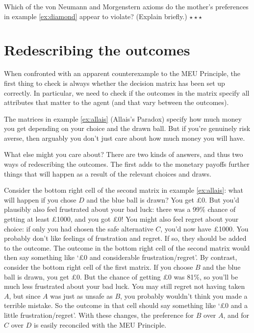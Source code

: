 \begin{exercise}
  Which of the von Neumann and Morgenstern axioms do the mother's
  preferences in example \ref{ex:diamond} appear to violate? (Explain
  briefly.)  $\star \star \star$
\end{exercise}


\section{Redescribing the outcomes}

When confronted with an apparent counterexample to the MEU Principle,
the first thing to check is always whether the decision matrix has
been set up correctly. In particular, we need to check if the outcomes
in the matrix specify all attributes that matter to the agent (and
that vary between the outcomes).

The matrices in example \ref{ex:allais} (Allais's Paradox) specify how
much money you get depending on your choice and the drawn ball. But if
you're genuinely risk averse, then arguably you don't just care about
how much money you will have. 

What else might you care about? There are two kinds of answers, and
thus two ways of redescribing the outcomes. The first adds to the
monetary payoffs further things that will happen as a result of the
relevant choices and draws.

Consider the bottom right cell of the second matrix in example
\ref{ex:allais}: what will happen if you chose $D$ and the blue ball
is drawn? You get £0. But you'd plausibly also feel frustrated about
your bad luck: there was a 99\% chance of getting at least £1000, and
you got £0! You might also feel regret about your choice: if only you
had chosen the safe alternative $C$, you'd now have £1000. You
probably don't like feelings of frustration and regret. If so, they
should be added to the outcome. The outcome in the bottom right cell
of the second matrix would then say something like `£0 and
considerable frustration/regret'. By contrast, consider the bottom
right cell of the first matrix. If you choose $B$ and the blue ball is
drawn, you get £0. But the chance of getting £0 was 81\%, so you'll be
much less frustrated about your bad luck. You may still regret not
having taken $A$, but since $A$ was just as unsafe as $B$, you
probably wouldn't think you made a terrible mistake. So the outcome in
that cell should say something like `£0 and a little
frustration/regret'. With these changes, the preference for $B$ over
$A$, and for $C$ over $D$ is easily reconciled with the MEU Principle.

